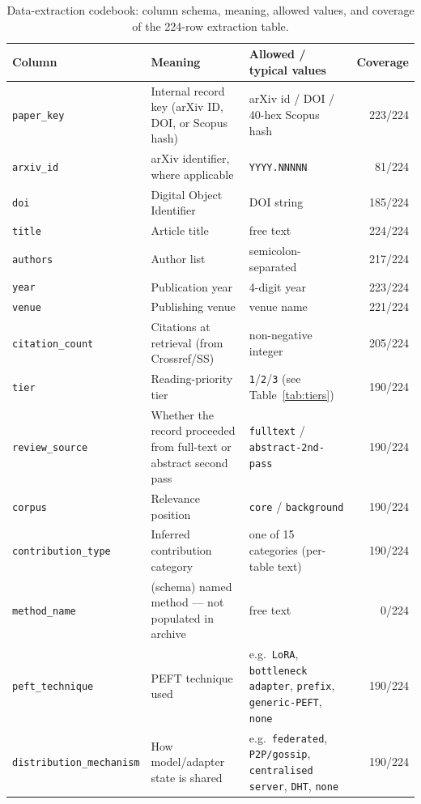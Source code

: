 \begin{table}
\centering
\caption{Data-extraction codebook: column schema, meaning, allowed values, and
coverage of the 224-row extraction table.}
\label{tab:extraction_codebook}
\small
\setlength{\tabcolsep}{4pt}
\begin{tabular}{lp{2.6cm}p{6.4cm}r}
\toprule
\textbf{Column} & \textbf{Meaning} & \textbf{Allowed / typical values} & \textbf{Coverage} \\
\midrule
\texttt{paper\_key} & Internal record key (arXiv ID, DOI, or Scopus hash) & arXiv id / DOI / 40-hex Scopus hash & 223/224 \\
\texttt{arxiv\_id} & arXiv identifier, where applicable & \texttt{YYYY.NNNNN} & 81/224 \\
\texttt{doi} & Digital Object Identifier & DOI string & 185/224 \\
\texttt{title} & Article title & free text & 224/224 \\
\texttt{authors} & Author list & semicolon-separated & 217/224 \\
\texttt{year} & Publication year & 4-digit year & 223/224 \\
\texttt{venue} & Publishing venue & venue name & 221/224 \\
\texttt{citation\_count} & Citations at retrieval (from Crossref/SS) & non-negative integer & 205/224 \\
\texttt{tier} & Reading-priority tier & \texttt{1}/\texttt{2}/\texttt{3} (see Table~\ref{tab:tiers}) & 190/224 \\
\texttt{review\_source} & Whether the record proceeded from full-text or abstract second pass & \texttt{fulltext} / \texttt{abstract-2nd-pass} & 190/224 \\
\texttt{corpus} & Relevance position & \texttt{core} / \texttt{background} & 190/224 \\
\texttt{contribution\_type} & Inferred contribution category & one of 15 categories (per-table text) & 190/224 \\
\texttt{method\_name} & (schema) named method — not populated in archive & free text & 0/224 \\
\texttt{peft\_technique} & PEFT technique used & e.g.\ \texttt{LoRA}, \texttt{bottleneck adapter}, \texttt{prefix}, \texttt{generic-PEFT}, \texttt{none} & 190/224 \\
\texttt{distribution\_mechanism} & How model/adapter state is shared & e.g.\ \texttt{federated}, \texttt{P2P/gossip}, \texttt{centralised server}, \texttt{DHT}, \texttt{none} & 190/224 \\

\end{tabular}
\end{table}
